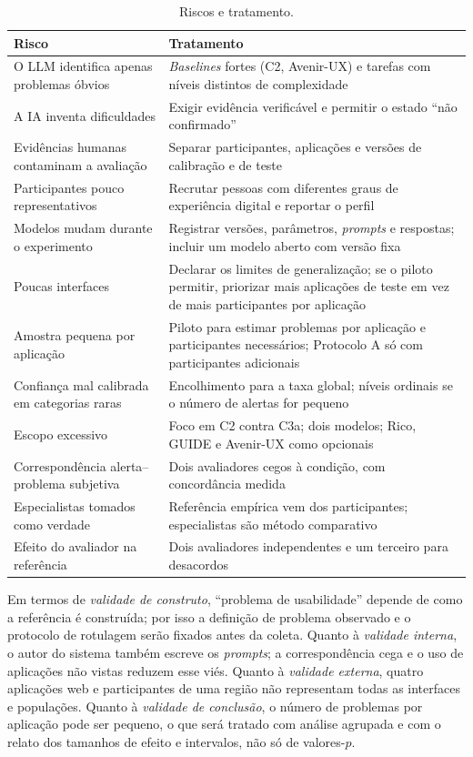 \documentclass[12pt]{article}
\begin{document}
\begin{table}[!ht]
\centering
\caption{Riscos e tratamento.}
\label{tab:riscos}
\footnotesize
\begin{tabularx}{\linewidth}{@{}>{\raggedright\arraybackslash}p{4.6cm} Y@{}}
\toprule
\textbf{Risco} & \textbf{Tratamento} \\
\midrule
O LLM identifica apenas problemas óbvios & \textit{Baselines} fortes (C2, Avenir-UX) e tarefas com níveis distintos de complexidade \\
A IA inventa dificuldades & Exigir evidência verificável e permitir o estado ``não confirmado'' \\
Evidências humanas contaminam a avaliação & Separar participantes, aplicações e versões de calibração e de teste \\
Participantes pouco representativos & Recrutar pessoas com diferentes graus de experiência digital e reportar o perfil \\
Modelos mudam durante o experimento & Registrar versões, parâmetros, \textit{prompts} e respostas; incluir um modelo aberto com versão fixa \\
Poucas interfaces & Declarar os limites de generalização; se o piloto permitir, priorizar mais aplicações de teste em vez de mais participantes por aplicação \\
Amostra pequena por aplicação & Piloto para estimar problemas por aplicação e participantes necessários; Protocolo A só com participantes adicionais \\
Confiança mal calibrada em categorias raras & Encolhimento para a taxa global; níveis ordinais se o número de alertas for pequeno \\
Escopo excessivo & Foco em C2 contra C3a; dois modelos; Rico, GUIDE e Avenir-UX como opcionais \\
Correspondência alerta--problema subjetiva & Dois avaliadores cegos à condição, com concordância medida \\
Especialistas tomados como verdade & Referência empírica vem dos participantes; especialistas são método comparativo \\
Efeito do avaliador na referência & Dois avaliadores independentes e um terceiro para desacordos \cite{hertzum2001evaluator} \\
\bottomrule
\end{tabularx}
\end{table}

Em termos de \textit{validade de construto}, ``problema de usabilidade'' depende de como a referência é construída; por isso a definição de problema observado e o protocolo de rotulagem serão fixados antes da coleta. Quanto à \textit{validade interna}, o autor do sistema também escreve os \textit{prompts}; a correspondência cega e o uso de aplicações não vistas reduzem esse viés. Quanto à \textit{validade externa}, quatro aplicações web e participantes de uma região não representam todas as interfaces e populações. Quanto à \textit{validade de conclusão}, o número de problemas por aplicação pode ser pequeno, o que será tratado com análise agrupada e com o relato dos tamanhos de efeito e intervalos, não só de valores-$p$.
\end{document}
